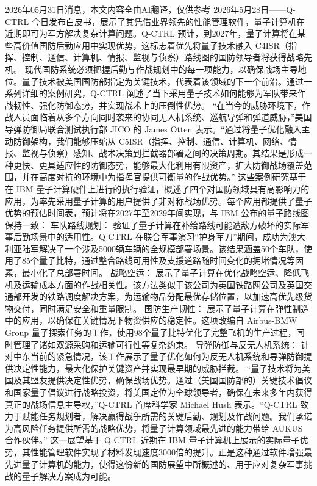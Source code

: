 \documentclass[12pt,a4paper]{ctexart}
\begin{document}
2026年05月31日消息，本文内容全由AI翻译，仅供参考
2026年5月28日——Q-CTRL 今日发布白皮书，展示了其凭借业界领先的性能管理软件，量子计算机在近期即可为军方解决复杂计算问题。Q-CTRL 预计，到2027年，量子计算将在某些高价值国防后勤应用中实现优势，这标志着优先将量子技术融入 C4ISR（指挥、控制、通信、计算机、情报、监视与侦察）路线图的国防领导者将获得战略先机。
现代国防系统必须把握后勤与作战规划中的每一项能力，以确保战场主导地位。量子技术被美国国防部指定为关键技术，代表着该领域的下一个前沿。通过一系列详细的案例研究，Q-CTRL 阐述了当下采用量子技术如何能够为军队带来作战韧性、强化防御态势，并实现战术上的压倒性优势。
“在当今的威胁环境下，作战人员面临着从多个方向同时袭来的协同无人机系统、巡航导弹和弹道威胁，”美国导弹防御局联合测试执行部 JICO 的 James Otten 表示。“通过将量子优化融入主动防御架构，我们能够压缩从 C5ISR（指挥、控制、通信、计算机、网络、情报、监视与侦察）感知、战术决策到拦截器部署之间的决策周期。其结果是形成一种更快、更具适应性的防御态势，能够最大化利用有限资产，扩大防御战场覆盖范围，并在高度对抗的环境中为指挥官提供可衡量的作战优势。”
这些案例研究基于在 IBM 量子计算硬件上进行的执行验证，概述了四个对国防领域具有高影响力的应用，为率先采用量子计算的用户提供了非对称战场优势。每个应用都提供了量子优势的预估时间表，预计将在2027年至2029年间实现，与 IBM 公布的量子路线图保持一致：
车队路线规划：
验证了量子计算在补给路线可能遭敌方破坏的实际军事后勤场景中的适用性。Q-CTRL 在联合军事演习“护身军刀”期间，成功为澳大利亚陆军解决了一个涉及5000辆车辆的全规模部署场景。该结果涵盖50个车队，使用了85个量子比特，通过整合路线可用性及支援道路随时间变化的拥堵情况等因素，最小化了总部署时间。
战略空运：
展示了量子计算在优化战略空运、降低飞机及运输成本方面的作战相关性。该方法类似于该公司为英国铁路网公司及英国交通部开发的铁路调度解决方案，为运输物品分配最优存储位置，以加速高优先级货物交付，同时满足安全和重量限制。
国防生产韧性：
展示了量子计算在弹性制造中的应用，以确保在关键情况下物资供应的稳定性。这项改编自 Airbus-BMW Group 量子探索任务的工作，使用98个量子比特优化了完整飞机的生产过程，同时管理了诸如双源采购和运输可行性等复杂约束。
导弹防御与反无人机系统：
针对中东当前的紧急情况，该工作展示了量子优化如何为反无人机系统和导弹防御提供决定性能力，最大化保护关键资产并实现最早期的威胁拦截。
“量子技术将为美国及其盟友提供决定性优势，确保战场优势。通过（美国国防部的）关键技术倡议和国家量子倡议进行战略投资，将美国定位为全球领导者，确保在未来多年内获得真正的战场信息主导权，”Q-CTRL 首席科学家 Michael Hush 表示。“Q-CTRL 致力于赋能任务规划者，解决赢得战争所需的关键后勤、规划及作战问题。我们承诺为高风险任务提供所需的战略优势，将量子计算领域最先进的能力带给 AUKUS 合作伙伴。”
这一展望基于 Q-CTRL 近期在 IBM 量子计算机上展示的实际量子优势，其性能管理软件实现了材料发现速度3000倍的提升。正是这种通过软件增强最先进量子计算机的能力，使得这份新的国防展望中所概述的、用于应对复杂军事挑战的量子解决方案成为可能。
\end{document}
